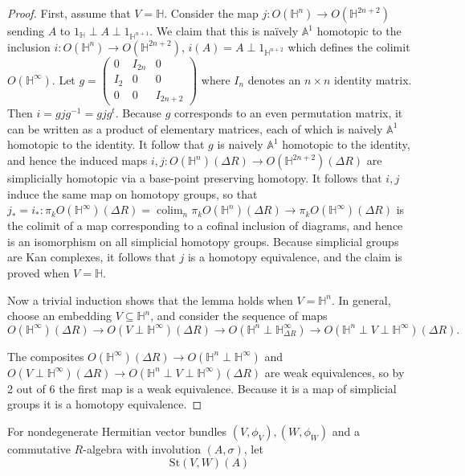 \documentclass[edeposit,fullpage]{uiucthesis2009}
\newcommand{\mbb}{\mathbb}
\newcommand{\St}{\mathrm{St}}
\DeclareMathOperator*{\colim}{colim}
\theoremstyle{plain}
\numberwithin{lemma}{section}
\theoremstyle{definition}
\begin{document}
\begin{proof}
First, assume that $V = \mbb H$. Consider the map $j : O(\mbb H^n)
\rightarrow O(\mbb H^{2n+2})$ sending $A$ to $1_{\mbb H} \perp A \perp
1_{\mbb H^{n+1}}$. We claim that this is na\"ively $\mbb A^1$ homotopic
to the inclusion $i : O(\mbb H^n) \rightarrow O(\mbb H^{2n+2})$, $i(A)
= A \perp 1_{\mbb H^{n+2}}$ which defines the colimit $O(\mbb
H^\infty)$. Let $g = \begin{pmatrix}
0 & I_{2n} & 0 \\
I_2 & 0 & 0 \\
0 & 0 & I_{2n+2}
\end{pmatrix}$ where $I_n$ denotes an $n \times n$ identity
matrix. Then $i = gjg^{-1} = gjg^t$. Because $g$ corresponds to an
even permutation matrix, it can be written as a product of elementary
matrices, each of which is naively $\mbb A^1$ homotopic to the
identity. It follow that $g$ is naively $\mbb A^1$ homotopic to the
identity, and hence the induced maps $i,j : O(\mbb H^n)(\Delta R)
\rightarrow O(\mbb H^{2n+2})(\Delta R)$ are simplicially homotopic
via a base-point preserving homotopy. It follows that $i,j$ induce the
same map on homotopy groups, so that $j_* = i_*: \pi_kO(\mbb
H^\infty)(\Delta R) = \colim_n \pi_k O(\mbb H^n)(\Delta R)
\rightarrow \pi_k O(\mbb H^\infty)(\Delta R)$ is the colimit of a map
corresponding to a cofinal inclusion of diagrams, and hence is an
isomorphism on all simplicial homotopy groups. Because simplicial
groups are Kan complexes, it follows that $j$ is a homotopy
equivalence, and the claim is proved when $V = \mbb H$.

Now a trivial induction shows that the lemma holds when $V = \mbb
H^n$. In general, choose an embedding $V \subseteq \mbb H^n$, and
consider the sequence of maps
\[
O(\mbb H^\infty)(\Delta R) \rightarrow O(V \perp \mbb
H^\infty)(\Delta R) \rightarrow O(\mbb H^n \perp \mbb H_{\Delta R}^\infty)
\rightarrow O(\mbb H^n \perp V \perp \mbb H^\infty)(\Delta R).
\]

The composites $O(\mbb H^\infty)(\Delta R) \rightarrow O(\mbb H^n
\perp \mbb H^\infty)$ and $O(V \perp \mbb
H^\infty)(\Delta R) \rightarrow O(\mbb H^n \perp V \perp \mbb
H^\infty)(\Delta R)$ are weak equivalences, so by 2 out of 6 the
first map is a weak equivalence. Because it is a map of simplicial
groups it is a homotopy equivalence. 
 
\end{proof}

For nondegenerate Hermitian vector bundles $(V,\phi_V), (W,\phi_W)$ and a commutative
$R$-algebra with involution $(A,\sigma)$, let
\[
\St(V,W)(A)
\]
\end{document}
